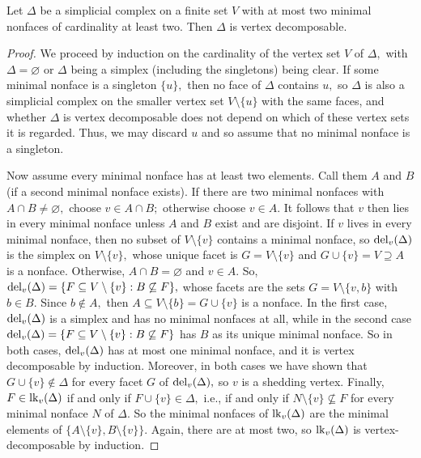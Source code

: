 \begin{lemma}
\label{lem: two-min faces implies vertex-decomposable}
Let $\Delta$ be a simplicial complex on a finite set $V$ with at most two minimal nonfaces of cardinality at least two. Then $\Delta$ is vertex decomposable.
\end{lemma}
\begin{proof}
    We proceed by induction on the cardinality of the vertex set $V$ of $\Delta,$ with $\Delta = \varnothing$ or $\Delta$ being a simplex (including the singletons) being clear.
    If some minimal nonface is a singleton $\{u\},$ then no face of $\Delta$ contains $u,$ so $\Delta$ is also a simplicial complex on the smaller vertex set $V\setminus\{u\}$ with the same faces, and whether $\Delta$ is vertex decomposable does not depend on which of these vertex sets it is regarded. Thus, we may discard $u$ and so assume that no minimal nonface is a singleton.
    
    Now assume every minimal nonface has at least two elements. 
    Call them $A$ and $B$ (if a second minimal nonface exists). 
    If there are two minimal nonfaces with $A\cap B\neq\varnothing,$ choose $v\in A\cap B;$ otherwise choose $v\in A.$ 
    It follows that $v$ then lies in every minimal nonface unless $A$ and $B$ exist and are disjoint.
    If $v$ lives in every minimal nonface, then no subset of $V\setminus\{v\}$ contains a minimal nonface, so $\mathrm{del}_v(\Delta)$ is the simplex on $V\setminus\{v\},$ whose unique facet is $G = V\setminus\{v\}$ and $G\cup\{v\} = V\supseteq A$ is a nonface. 
    Otherwise, $A\cap B = \varnothing$ and $v\in A.$ 
    So, $\mathrm{del}_v(\Delta) = \{F\subseteq V\setminus\{v\}:B\not\subseteq F\},$ whose facets are the sets $G = V\setminus\{v,b\}$ with $b\in B.$  
    Since $b\not\in A,$ then $A\subseteq V\setminus\{b\} = G\cup\{v\}$ is a nonface. 
    In the first case, $\mathrm{del}_v(\Delta)$ is a simplex and has no minimal nonfaces at all, while in the second case $\mathrm{del}_v(\Delta) = \{F\subseteq V\setminus\{v\}:B\not\subseteq F\}$ has $B$ as its unique minimal nonface. So in both cases, $\mathrm{del}_v(\Delta)$ has at most one minimal nonface, and it is vertex decomposable by induction. Moreover, in both cases we have shown that $G\cup\{v\}\not\in\Delta$ for every facet $G$ of $\mathrm{del}_v(\Delta),$ so $v$ is a shedding vertex.
    Finally, $F\in\mathrm{lk}_v(\Delta)$ if and only if $F\cup\{v\}\in\Delta,$ i.e., if and only if $N\setminus\{v\}\not\subseteq F$ for every minimal nonface $N$ of $\Delta.$ So the minimal nonfaces of $\mathrm{lk}_v(\Delta)$ are the minimal elements of $\{A\setminus\{v\}, B\setminus\{v\}\}.$ Again, there are at most two, so $\mathrm{lk}_v(\Delta)$ is vertex-decomposable by induction. 
\end{proof}

